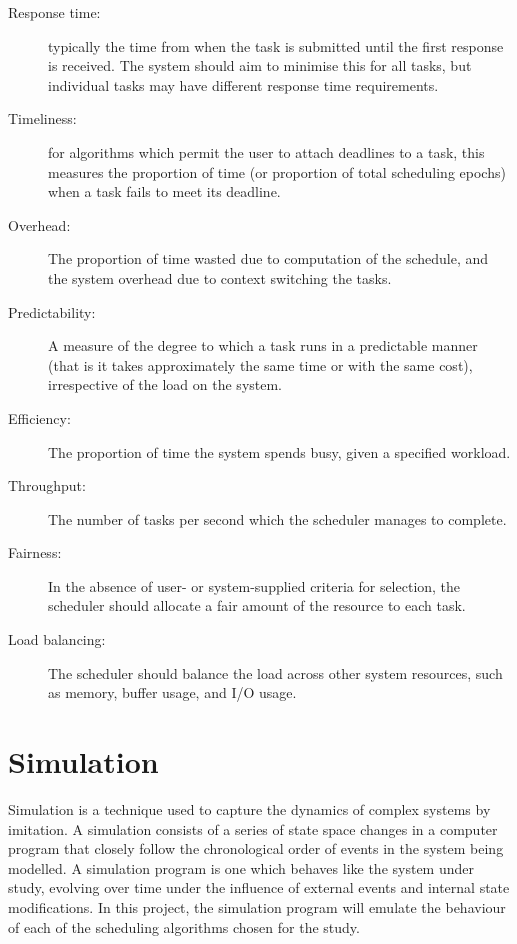 \documentclass[12pt]{article}
\begin{document}
\begin{description}

\item [Response time:] typically the time from when the task is submitted
until the first response is received.  The system should aim to minimise
this for all tasks, but individual tasks may have different response
time requirements.

\item [Timeliness:] for algorithms which permit the user to attach deadlines
to a task, this measures the proportion of time (or proportion of
total scheduling epochs) when a task fails to meet its deadline.

\item [Overhead:] The proportion of time wasted due to computation of the
schedule, and the system overhead due to context switching the
tasks.

\item [Predictability:] A measure of the degree to which a task runs in a
predictable manner (that is it takes approximately the same time or
with the same cost), irrespective of the load on the system.

\item [Efficiency:] The proportion of time the system spends busy, given a
specified workload.

\item [Throughput:] The number of tasks per second which the scheduler
manages to complete.

\item [Fairness:] In the absence of user- or system-supplied criteria for
selection, the scheduler should allocate a fair amount of the resource
to each task.

\item [Load balancing:] The scheduler should balance the load across other
system resources, such as memory, buffer usage, and I/O usage.

\end{description}


\section*{Simulation}

Simulation is a technique used to capture the dynamics of complex
systems by imitation.  A simulation consists of a series of state space
changes in a computer program that closely follow the chronological
order of events in the system being modelled.  A simulation program is
one which behaves like the system under study, evolving over time
under the influence of external events and internal state
modifications. In this project, the simulation program will emulate
the behaviour of each of the scheduling algorithms chosen for the
study.
\end{document}

